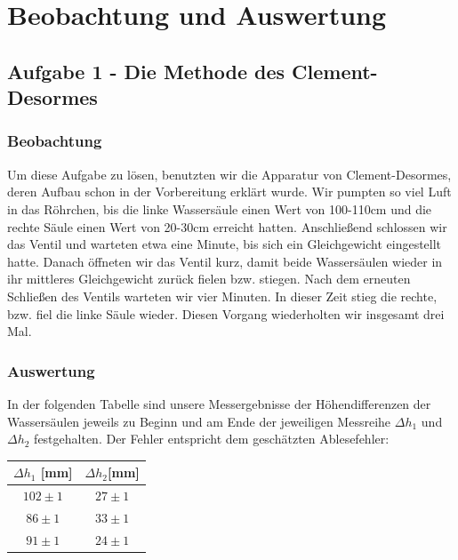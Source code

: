 \documentclass{article}
\begin{document}
{{\newpage

\section{Beobachtung und Auswertung}
\subsection{Aufgabe 1 - Die Methode des Clement-Desormes}
\subsubsection{Beobachtung}
Um diese Aufgabe zu lösen, benutzten wir die Apparatur von Clement-Desormes, deren Aufbau schon in der Vorbereitung erklärt wurde. Wir pumpten so viel Luft in das Röhrchen, bis die linke Wassersäule einen Wert von 100-110cm und die rechte Säule einen Wert von 20-30cm erreicht hatten. Anschließend schlossen wir das Ventil und warteten etwa eine Minute, bis sich ein Gleichgewicht eingestellt hatte. Danach öffneten wir das Ventil kurz, damit beide Wassersäulen wieder in ihr mittleres Gleichgewicht zurück fielen bzw. stiegen. Nach dem erneuten Schließen des Ventils warteten wir vier Minuten. In dieser Zeit stieg die rechte, bzw. fiel die linke Säule wieder. Diesen Vorgang wiederholten wir insgesamt drei Mal.\\

\subsubsection{Auswertung}
In der folgenden Tabelle sind unsere Messergebnisse der Höhendifferenzen der Wassersäulen jeweils zu Beginn und am Ende der jeweiligen Messreihe \(\Delta h_1\) und \(\Delta h_2\) festgehalten. Der Fehler entspricht dem geschätzten Ablesefehler:
\\

\vspace{1cm}
\begin{center}
\begin{tabular}{c|c}
\(\Delta h_1\) [mm] & \(\Delta h_2\)[mm]\\
\hline
\(102 \pm 1\) & \(27\pm 1\)\\
\(86 \pm 1\) & \(33\pm 1\)\\
\(91 \pm 1\) & \(24\pm 1\)\\
\end{tabular}
\end{center}

}}
\end{document}

